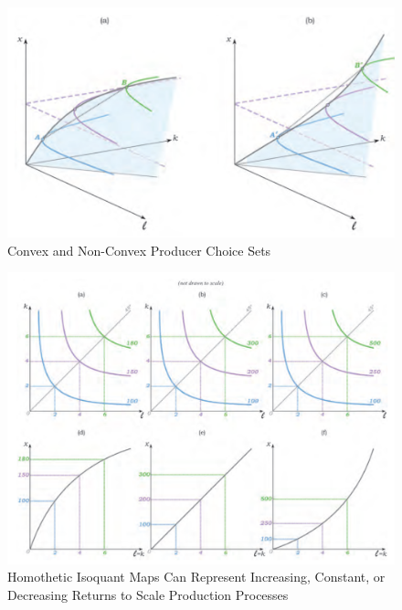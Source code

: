 \documentclass{article}
\begin{document}
\begin{figure}[H] %
	\centering %
	\includegraphics[width=1\textwidth]{12_2} %
	\caption{Convex and Non-Convex Producer Choice Sets} %
	\label{Fig.main3} %
\end{figure}

\begin{figure}[H] %
	\centering %
	\includegraphics[width=1\textwidth]{12_3} %
	\caption{Homothetic Isoquant Maps Can Represent Increasing, Constant, or Decreasing Returns to Scale
		Production Processes} %
	\label{Fig.main4} %
\end{figure}
\end{document}
